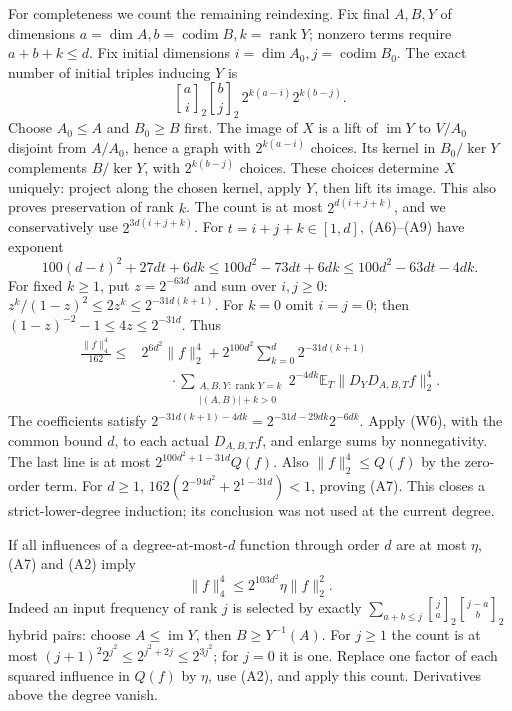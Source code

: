 For completeness we count the remaining reindexing. Fix final $A,B,Y$
of dimensions $a=\dim A,b=\operatorname{codim}B,k=\operatorname{rank}Y$;
nonzero terms require $a+b+k\le d$. Fix initial dimensions
$i=\dim A_0,j=\operatorname{codim}B_0$. The exact number of initial
triples inducing $Y$ is
\[
 \genfrac{[}{]}{0pt}{}{a}{i}_2\genfrac{[}{]}{0pt}{}{b}{j}_2\,2^{k(a-i)}2^{k(b-j)}.   \tag{A9}
\]
Choose $A_0\le A$ and $B_0\ge B$ first. The image of $X$ is a lift
of $\operatorname{im}Y$ to $V/A_0$ disjoint from $A/A_0$, hence a graph
with $2^{k(a-i)}$ choices. Its kernel in $B_0/\ker Y$ complements
$B/\ker Y$, with $2^{k(b-j)}$ choices. These choices determine $X$
uniquely: project along the chosen kernel, apply $Y$, then lift its
image. This also proves preservation of rank $k$.
The count is at most $2^{d(i+j+k)}$, and we conservatively use
$2^{3d(i+j+k)}$. For $t=i+j+k\in[1,d]$, (A6)--(A9) have exponent
\[
 100(d-t)^2+27dt+6dk
 \le100d^2-73dt+6dk
 \le100d^2-63dt-4dk.                                \tag{A10}
\]
For fixed $k\ge1$, put $z=2^{-63d}$ and sum over $i,j\ge0$:
$z^k/(1-z)^2\le2z^k\le2^{-31d(k+1)}$.
For $k=0$ omit $i=j=0$; then
$(1-z)^{-2}-1\le4z\le2^{-31d}$. Thus
\[
 \begin{split}
 \frac{\|f\|_4^4}{162}\le {}&2^{6d^2}\|f\|_2^4+
 2^{100d^2}\sum_{k=0}^d2^{-31d(k+1)}\\[-2pt]
 &\qquad\cdot\sum_{\substack{A,B,Y:\operatorname{rank}Y=k\\
                             |(A,B)|+k>0}}
 2^{-4dk}\mathbb E_T\|D_YD_{A,B,T}f\|_2^4.          \end{split}\tag{A11}
\]
The coefficients satisfy
$2^{-31d(k+1)-4dk}=2^{-31d-29dk}2^{-6dk}$.
Apply (W6), with the common bound $d$, to each actual $D_{A,B,T}f$,
and enlarge sums by nonnegativity. The last line is at most
$2^{100d^2+1-31d}Q(f)$. Also $\|f\|_2^4\le Q(f)$ by the zero-order
term. For $d\ge1$,
$162(2^{-94d^2}+2^{1-31d})<1$, proving (A7).
This closes a strict-lower-degree induction; its conclusion was not
used at the current degree.

If all influences of a degree-at-most-$d$ function through order $d$
are at most $\eta$, (A7) and (A2) imply
\[
 \|f\|_4^4\le2^{103d^2}\eta\|f\|_2^2.             \tag{A12}
\]
Indeed an input frequency of rank $j$ is selected by exactly
$\sum_{a+b\le j}\genfrac{[}{]}{0pt}{}{j}{a}_2\genfrac{[}{]}{0pt}{}{j-a}{b}_2$ hybrid pairs:
choose $A\le\operatorname{im}Y$, then $B\ge Y^{-1}(A)$.
For $j\ge1$ the count is at most
$(j+1)^2 2^{j^2}\le2^{j^2+2j}\le2^{3j^2}$; for $j=0$ it is one.
Replace one factor of each squared influence in $Q(f)$ by $\eta$,
use (A2), and apply this count. Derivatives above the degree vanish.

